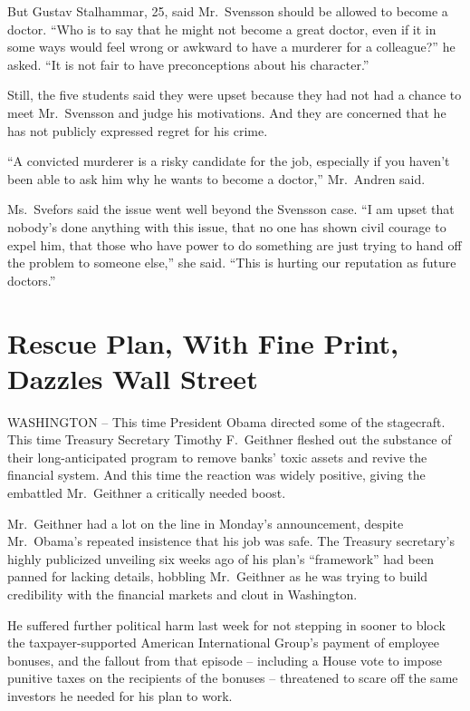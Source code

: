 \documentclass[12pt,a4paper,onecolumn]{article}
\begin{document}
\begin{CJK*}{GBK}{song}
But Gustav Stalhammar, 25, said Mr.~Svensson should be allowed to become a doctor. ``Who is to say
that he might not become a great doctor, even if it in some ways would feel wrong or awkward to have
a murderer for a colleague?'' he asked. ``It is not fair to have preconceptions about his
character.''

Still, the five students said they were upset because they had not had a chance to meet Mr.~Svensson
and judge his motivations. And they are concerned that he has not publicly expressed regret for his
crime.

``A convicted murderer is a risky candidate for the job, especially if you haven't been able to ask
him why he wants to become a doctor,'' Mr.~Andren said.

Ms.~Svefors said the issue went well beyond the Svensson case. ``I am upset that nobody's done
anything with this issue, that no one has shown civil courage to expel him, that those who have
power to do something are just trying to hand off the problem to someone else,'' she said. ``This is
hurting our reputation as future doctors.''

\section{Rescue Plan, With Fine Print, Dazzles Wall Street}

WASHINGTON -- This time President Obama directed some of the stagecraft. This time Treasury
Secretary Timothy F.~Geithner fleshed out the substance of their long-anticipated program to remove
banks' toxic assets and revive the financial system. And this time the reaction was widely positive,
giving the embattled Mr.~Geithner a critically needed boost.

Mr.~Geithner had a lot on the line in Monday's announcement, despite Mr.~Obama's repeated insistence
that his job was safe. The Treasury secretary's highly publicized unveiling six weeks ago of his
plan's ``framework'' had been panned for lacking details, hobbling Mr.~Geithner as he was trying to
build credibility with the financial markets and clout in Washington.

He suffered further political harm last week for not stepping in sooner to block the
taxpayer-supported American International Group's payment of employee bonuses, and the fallout from
that episode -- including a House vote to impose punitive taxes on the recipients of the bonuses --
threatened to scare off the same investors he needed for his plan to work.


\end{CJK*}
\end{document}
